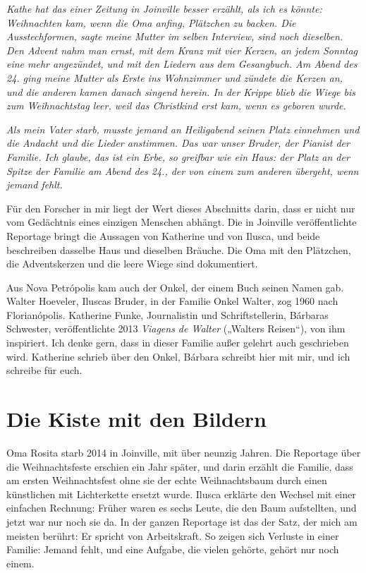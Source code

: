 \documentclass[
  ngerman,
  11pt,
  openany]{book}
\begin{document}
\emph{Kathe hat das einer Zeitung in Joinville besser erzählt, als ich
es könnte: Weihnachten kam, wenn die Oma anfing, Plätzchen zu backen.
Die Ausstechformen, sagte meine Mutter im selben Interview, sind noch
dieselben. Den Advent nahm man ernst, mit dem Kranz mit vier Kerzen, an
jedem Sonntag eine mehr angezündet, und mit den Liedern aus dem
Gesangbuch. Am Abend des 24. ging meine Mutter als Erste ins Wohnzimmer
und zündete die Kerzen an, und die anderen kamen danach singend herein.
In der Krippe blieb die Wiege bis zum Weihnachtstag leer, weil das
Christkind erst kam, wenn es geboren wurde.}

\emph{Als mein Vater starb, musste jemand an Heiligabend seinen Platz
einnehmen und die Andacht und die Lieder anstimmen. Das war unser
Bruder, der Pianist der Familie. Ich glaube, das ist ein Erbe, so
greifbar wie ein Haus: der Platz an der Spitze der Familie am Abend des
24., der von einem zum anderen übergeht, wenn jemand fehlt.}

Für den Forscher in mir liegt der Wert dieses Abschnitts darin, dass er
nicht nur vom Gedächtnis eines einzigen Menschen abhängt. Die in
Joinville veröffentlichte Reportage bringt die Aussagen von Katherine
und von Ilusca, und beide beschreiben dasselbe Haus und dieselben
Bräuche. Die Oma mit den Plätzchen, die Adventskerzen und die leere
Wiege sind dokumentiert.

Aus Nova Petrópolis kam auch der Onkel, der einem Buch seinen Namen gab.
Walter Hoeveler, Iluscas Bruder, in der Familie Onkel Walter, zog 1960
nach Florianópolis. Katherine Funke, Journalistin und Schriftstellerin,
Bárbaras Schwester, veröffentlichte 2013 \emph{Viagens de Walter}
(„Walters Reisen``), von ihm inspiriert. Ich denke gern, dass in dieser
Familie außer gelehrt auch geschrieben wird. Katherine schrieb über den
Onkel, Bárbara schreibt hier mit mir, und ich schreibe für euch.

\section{Die Kiste mit den Bildern}\label{die-kiste-mit-den-bildern}

Oma Rosita starb 2014 in Joinville, mit über neunzig Jahren. Die
Reportage über die Weihnachtsfeste erschien ein Jahr später, und darin
erzählt die Familie, dass am ersten Weihnachtsfest ohne sie der echte
Weihnachtsbaum durch einen künstlichen mit Lichterkette ersetzt wurde.
Ilusca erklärte den Wechsel mit einer einfachen Rechnung: Früher waren
es sechs Leute, die den Baum aufstellten, und jetzt war nur noch sie da.
In der ganzen Reportage ist das der Satz, der mich am meisten berührt:
Er spricht von Arbeitskraft. So zeigen sich Verluste in einer Familie:
Jemand fehlt, und eine Aufgabe, die vielen gehörte, gehört nur noch
einem.
\end{document}
